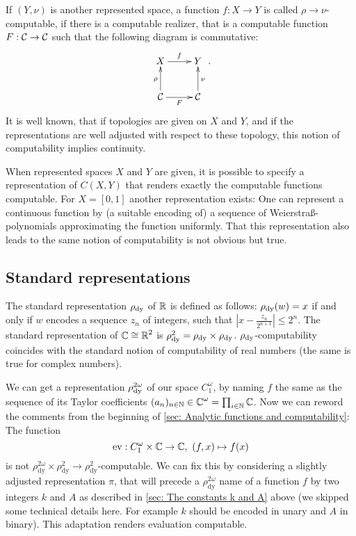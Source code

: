 		If $(Y,\nu)$ is another represented space, a function $f:X\to Y$ is called $\rho\to\nu$-computable, if there is a computable realizer, that is a computable function $F:\operatorname{\mathcal{C}}\to\operatorname{\mathcal{C}}$ such that the following diagram is commutative:
		\[ \begin{xy}
		\xymatrix{X\ar[r]^f & Y \\ \can \ar[r]_F\ar[u]^\rho & \can \ar[u]_\nu}
		\end{xy}. \]
		It is well known, that if topologies are given on $X$ and $Y$, and if the representations are well adjusted with respect to these topology, this notion of computability implies continuity.

		When represented spaces $X$ and $Y$ are given, it is possible to specify a representation of $C(X,Y)$ that renders exactly the computable functions computable. For $X=[0,1]$ another representation exists: One can represent a continuous function by (a suitable encoding of) a sequence of Weierstraß-polynomials approximating the function uniformly. That this representation also leads to the same notion of computability is not obvious but true.

	\subsection{Standard representations}\label{sec: Standard representations}

		The standard representation $\rho_{\mathrm{dy}}$ of $\operatorname{\mathbb{R}}$ is defined as follows: $\rho_{\mathrm{dy}}(w) = x$ if and only if $w$ encodes a sequence $z_n$ of integers, such that $\left|x - \frac{z_n}{2^{n+1}}\right| \leq 2^n$. The standard representation of $\operatorname{\mathbb{C}} \cong \operatorname{\mathbb{R}}^2$ is $\rho^2_{\mathrm{dy}} = \rho_{\mathrm{dy}} \times \rho_{\mathrm{dy}}$. $\rho_{\mathrm{dy}}$-computability coincides with the standard notion of computability of real numbers (the same is true for complex numbers).

		We can get a representation $\rho_{\mathrm{dy}}^{2\omega}$ of our space $C^\omega_1$, by naming $f$ the same as the sequence of its Taylor coefficients $(a_n)_{n\in \operatorname{\mathbb{N}}} \in \operatorname{\mathbb{C}}^\omega = \prod_{i\in \operatorname{\mathbb{N}}}\operatorname{\mathbb{C}}$. Now we can reword the comments from the beginning of \cref{sec: Analytic functions and computability}: The function
		\[ \mathrm{ev}: C^\omega_1\times \operatorname{\mathbb{C}} \to \operatorname{\mathbb{C}}, ~ (f,x) \mapsto f(x) \]
		is not $\rho^{2\omega}_{\mathrm{dy}}\times \rho^2_{\mathrm{dy}}\to\rho^2_{\mathrm{dy}}$-computable. We can fix this by considering a slightly adjusted representation $\pi$, that will precede a $\rho^{2\omega}_{\mathrm{dy}}$ name of a function $f$ by two integers $k$ and $A$ as described in \cref{sec: The constants k and A} above (we skipped some technical details here. For example $k$ should be encoded in unary and $A$ in binary). This adaptation renders evaluation computable.

